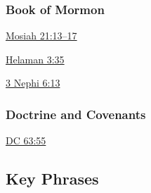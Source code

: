 	\subsubsection{Book of Mormon} %
		\label{HUMILITY-BOM}
	
		
		\begin{compactdesc}
			\item[{\hyperref[MOSIAH-21-13]{Mosiah 21:13--17}}]
			\item[{\hyperref[HELAMAN-3-35]{Helaman 3:35}}]
			\item[{\hyperref[3NEPHI-6-13]{3 Nephi 6:13}}]
		\end{compactdesc}
		
	\subsubsection{Doctrine and Covenants} %
		\label{HUMILITY-DC}
	
		
		\begin{compactdesc}
			\item[{\hyperref[DC63-55]{DC 63:55}}]
		\end{compactdesc}
		
	
		
		
\subsection{Key Phrases} %
	\label{HUMILITY-PHRASES}

